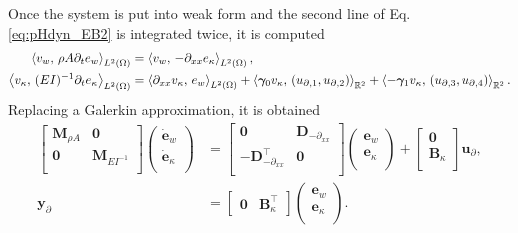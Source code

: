 Once the system is put into weak form and the second line of Eq. \eqref{eq:pHdyn_EB2} is integrated twice, it is  computed 
\begin{equation}\label{eq:weak_EB_divDiv}
\begin{aligned}
\inner[L^2(\Omega)]{v_w}{\rho A \partial_t e_w} &= \inner[L^2(\Omega)]{v_w}{-\partial_{xx} e_\kappa} , \\
\inner[L^2(\Omega)]{v_\kappa}{(EI)^{-1} \partial_t e_\kappa} &= \inner[L^2(\Omega)]{\partial_{xx} v_\kappa}{ e_w}  + \inner[\mathbb{R}^2]{\bm\gamma_0 v_\kappa}{({u}_{\partial, 1}, {u}_{\partial, 2})} + \inner[\mathbb{R}^2]{-\bm\gamma_1 v_\kappa}{({u}_{\partial, 3}, {u}_{\partial, 4})}. \\
\end{aligned}
\end{equation}
Replacing a Galerkin approximation, it is obtained
\begin{equation}
\begin{aligned}
\begin{bmatrix}
\mathbf{M}_{\rho A} & \mathbf{0} \\
\mathbf{0} & \mathbf{M}_{EI^{-1}} \\
\end{bmatrix}
\begin{pmatrix}
\dot{\mathbf{e}}_{w} \\
\dot{\mathbf{e}}_{\kappa} \\
\end{pmatrix}
&= \begin{bmatrix}
\mathbf{0} & \mathbf{D}_{-\partial_{xx}} \\
-\mathbf{D}_{-\partial_{xx}}^\top & \mathbf{0} \\
\end{bmatrix} 
\begin{pmatrix}
\mathbf{e}_{w} \\
\mathbf{e}_{\kappa} \\
\end{pmatrix} + 
\begin{bmatrix}
\mathbf{0}\\
\mathbf{B}_\kappa\\
\end{bmatrix}
\mathbf{u}_\partial, \\
{\mathbf{y}_\partial} &= \begin{bmatrix}
\mathbf{0} & \mathbf{B}_\kappa^\top 
\end{bmatrix}\begin{pmatrix}
\mathbf{e}_{w} \\
\mathbf{e}_{\kappa} \\
\end{pmatrix}.
\end{aligned}
\end{equation}
